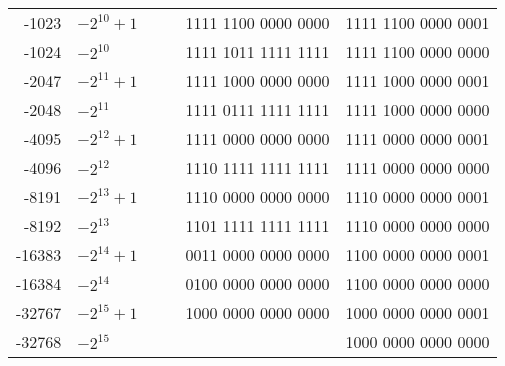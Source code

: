 \documentclass[a4paper,10pt]{article}
\begin{document}
\begin{center}
\begin{tabular}{rlrrrr}
    -1023 &$ -2^{10} + 1 $&                     &      & 1111 1100 0000 0000 & 1111 1100 0000 0001 \\
    -1024 &$ -2^{10}     $&                     &      & 1111 1011 1111 1111 & 1111 1100 0000 0000 \\
    -2047 &$ -2^{11} + 1 $&                     &      & 1111 1000 0000 0000 & 1111 1000 0000 0001 \\
    -2048 &$ -2^{11}     $&                     &      & 1111 0111 1111 1111 & 1111 1000 0000 0000 \\
    -4095 &$ -2^{12} + 1 $&                     &      & 1111 0000 0000 0000 & 1111 0000 0000 0001 \\
    -4096 &$ -2^{12}     $&                     &      & 1110 1111 1111 1111 & 1111 0000 0000 0000 \\
    -8191 &$ -2^{13} + 1 $&                     &      & 1110 0000 0000 0000 & 1110 0000 0000 0001 \\
    -8192 &$ -2^{13}     $&                     &      & 1101 1111 1111 1111 & 1110 0000 0000 0000 \\
   -16383 &$ -2^{14} + 1 $&                     &      & 0011 0000 0000 0000 & 1100 0000 0000 0001 \\
   -16384 &$ -2^{14}     $&                     &      & 0100 0000 0000 0000 & 1100 0000 0000 0000 \\
   -32767 &$ -2^{15} + 1 $&                     &      & 1000 0000 0000 0000 & 1000 0000 0000 0001 \\
   -32768 &$ -2^{15}     $&                     &      &                     & 1000 0000 0000 0000 \\
    \bottomrule
\end{tabular}
\end{center}
\end{document}
